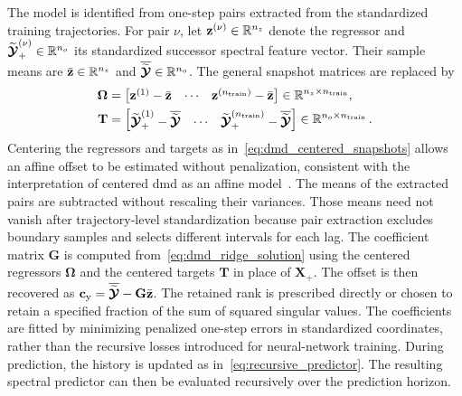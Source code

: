 The model is identified from one-step pairs extracted from the standardized training trajectories.
For pair $\nu$, let $\mathbf{z}^{(\nu)}\in\mathbb{R}^{n_{z}}$ denote the regressor and $\widetilde{\boldsymbol{\mathcal{Y}}{}}_+^{(\nu)}\in\mathbb{R}^{n_{o}}$ its standardized successor spectral feature vector.
Their sample means are $\bar{\mathbf{z}}\in\mathbb{R}^{n_{z}}$ and $\overline{\widetilde{\boldsymbol{\mathcal{Y}}{}}}\in\mathbb{R}^{n_{o}}$.
The general snapshot matrices are replaced by
\begin{equation}
    \begin{aligned}
    \boldsymbol{\Omega}
    &=\begin{bmatrix}
        \mathbf{z}^{(1)}-\bar{\mathbf{z}} & \cdots &
        \mathbf{z}^{(n_{\mathrm{train}}{})}-\bar{\mathbf{z}}
    \end{bmatrix}
    \in\mathbb{R}^{n_{z}\times n_{\mathrm{train}}{}},\\
    \mathbf{T}
    &=\begin{bmatrix}
        \widetilde{\boldsymbol{\mathcal{Y}}{}}_+^{(1)}-\overline{\widetilde{\boldsymbol{\mathcal{Y}}{}}} & \cdots &
        \widetilde{\boldsymbol{\mathcal{Y}}{}}_+^{(n_{\mathrm{train}}{})}-\overline{\widetilde{\boldsymbol{\mathcal{Y}}{}}}
    \end{bmatrix}
    \in\mathbb{R}^{n_{o}\times n_{\mathrm{train}}{}}\,.
    \end{aligned}
    \label{eq:dmd_centered_snapshots}
\end{equation}
Centering the regressors and targets as in~\eqref{eq:dmd_centered_snapshots} allows an affine offset to be estimated without penalization, consistent with the interpretation of centered \ac{dmd} as an affine model~\cite{Hirsh2020}.
The means of the extracted pairs are subtracted without rescaling their variances.
Those means need not vanish after trajectory-level standardization because pair extraction excludes boundary samples and selects different intervals for each lag.
The coefficient matrix $\mathbf G$ is computed from~\eqref{eq:dmd_ridge_solution} using the centered regressors $\boldsymbol\Omega$ and the centered targets $\mathbf T$ in place of $\mathbf X_+$.
The offset is then recovered as $\mathbf{c}_\mathrm{y}=\overline{\widetilde{\boldsymbol{\mathcal{Y}}{}}}-\mathbf{G}\bar{\mathbf{z}}$.
The retained rank is prescribed directly or chosen to retain a specified fraction of the sum of squared singular values.
The coefficients are fitted by minimizing penalized one-step errors in standardized coordinates, rather than the recursive losses introduced for neural-network training.
During prediction, the history is updated as in~\eqref{eq:recursive_predictor}.
The resulting spectral predictor can then be evaluated recursively over the prediction horizon.

